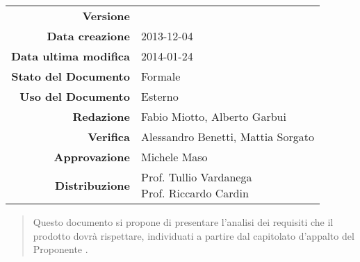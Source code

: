 

\newcommand{\Versione}{\versioneAnalisiDeiRequisiti{}}	%
\newcommand{\Data}{2013-12-04}							%
\newcommand{\DataUltimaModifica}{2014-01-24}
\newcommand{\TipoDocumento}{Analisi dei Requisiti}		%






\begin{center}
\begin{tabular}{r|l}
\textbf{Versione} & \Versione{} \\
\textbf{Data creazione} & \Data{} \\
\textbf{Data ultima modifica} & \DataUltimaModifica{} \\
\textbf{Stato del Documento} & Formale \\					%
\textbf{Uso del Documento} & Esterno \\						%
\textbf{Redazione} & Fabio Miotto, Alberto Garbui\\			%
\textbf{Verifica} & Alessandro Benetti, Mattia Sorgato\\	%
\textbf{Approvazione} & Michele Maso\\					    %
\textbf{Distribuzione} & \parbox[t]{4cm}{Prof. Tullio Vardanega \\ Prof. Riccardo Cardin \\ \Prop{} }\\
\end{tabular}
\end{center}

\vspace{0.05in}

\begin{abstract}
\begin{center}
Questo documento si propone di presentare l'analisi dei requisiti che il prodotto \Progetto{} dovrà rispettare, individuati a partire dal capitolato d'appalto del Proponente \Prop{}.
\end{center}
\end{abstract}

